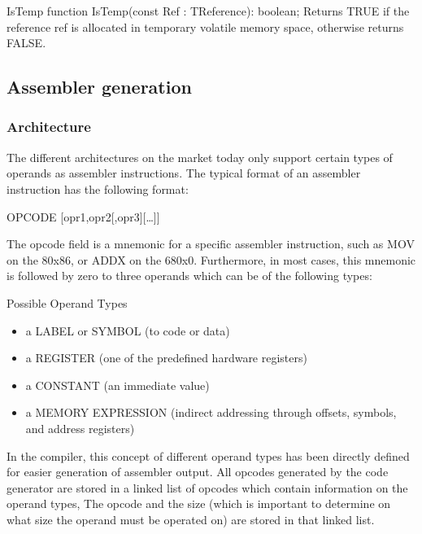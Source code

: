 \documentclass [12pt]{article}
\begin{document}
\begin{function}{IsTemp}
\Declaration
function IsTemp(const Ref : TReference): boolean;
\Description 
Returns TRUE if the reference \textsf{ref }is allocated in temporary
volatile memory space, otherwise returns FALSE. 
\end{function}

\subsection{Assembler generation}
\label{subsec:mylabel8}

\subsubsection{Architecture}
\label{subsubsec:architectureneration}

The different architectures on the market today only support certain types 
of operands as assembler instructions. The typical format of an assembler 
instruction has the following format:

\begin{center}
\textsf{OPCODE [opr1,opr2[,opr3][\ldots ]]}
\end{center}

The opcode field is a mnemonic for a specific assembler instruction, such as 
\textsf{MOV} on the 80x86, or \textsf{ADDX} on the 680x0. Furthermore, in 
most cases, this mnemonic is followed by zero to three operands which can be 
of the following types:

Possible Operand Types 
\begin{itemize}
\item a LABEL or SYMBOL (to code or data) 
\item a REGISTER (one of the predefined hardware registers)  
\item a CONSTANT (an immediate value) 
\item a MEMORY EXPRESSION (indirect addressing through offsets, symbols, and
     address registers)
\end{itemize}

In the compiler, this concept of different operand types has been directly 
defined for easier generation of assembler output. All opcodes generated by 
the code generator are stored in a linked list of opcodes which contain 
information on the operand types, The opcode and the size (which is 
important to determine on what size the operand must be operated on) are 
stored in that linked list. 
\end{document}
